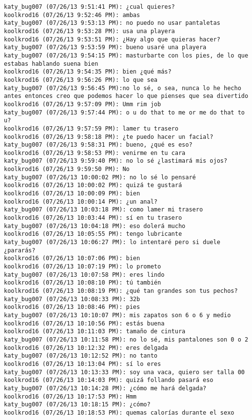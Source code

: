 \begin{verbatim}
katy_bug007 (07/26/13 9:51:41 PM): ¿cual quieres? 
koolkrod16 (07/26/13 9:52:46 PM): ambas
katy_bug007 (07/26/13 9:53:13 PM): no puedo no usar pantaletas 
koolkrod16 (07/26/13 9:53:28 PM): usa una playera
koolkrod16 (07/26/13 9:53:51 PM): ¿Hay algo que quieras hacer?
katy_bug007 (07/26/13 9:53:59 PM): bueno usaré una playera
katy_bug007 (07/26/13 9:54:15 PM): masturbarte con los pies, de lo que estabas hablando suena bien
koolkrod16 (07/26/13 9:54:35 PM): bien ¿qué más?
koolkrod16 (07/26/13 9:56:26 PM): lo que sea
katy_bug007 (07/26/13 9:56:45 PM):no lo sé, o sea, nunca lo he hecho antes entonces creo que podemos hacer lo que pienses que sea divertido
koolkrod16 (07/26/13 9:57:09 PM): Umm rim job
katy_bug007 (07/26/13 9:57:44 PM): o u do that to me or me do that to u? 
koolkrod16 (07/26/13 9:57:59 PM): lamer tu trasero
koolkrod16 (07/26/13 9:58:18 PM): ¿te puedo hacer un facial?
katy_bug007 (07/26/13 9:58:31 PM): bueno, ¿qué es eso?
koolkrod16 (07/26/13 9:58:53 PM): venirme en tu cara
katy_bug007 (07/26/13 9:59:40 PM): no lo sé ¿lastimará mis ojos?
koolkrod16 (07/26/13 9:59:50 PM): No
katy_bug007 (07/26/13 10:00:02 PM): no lo sé lo pensaré
koolkrod16 (07/26/13 10:00:02 PM): quizá te gustará
koolkrod16 (07/26/13 10:00:09 PM): bien
koolkrod16 (07/26/13 10:00:14 PM): ¿un anal?
katy_bug007 (07/26/13 10:03:18 PM): como lamer mi trasero
koolkrod16 (07/26/13 10:03:44 PM): sí en tu trasero
katy_bug007 (07/26/13 10:04:18 PM): eso dolerá mucho
koolkrod16 (07/26/13 10:05:55 PM): tengo lubricante
katy_bug007 (07/26/13 10:06:27 PM): lo intentaré pero si duele ¿pararás?
koolkrod16 (07/26/13 10:07:06 PM): bien
koolkrod16 (07/26/13 10:07:19 PM): lo prometo
katy_bug007 (07/26/13 10:07:58 PM): eres lindo
koolkrod16 (07/26/13 10:08:10 PM): tú también
koolkrod16 (07/26/13 10:08:19 PM): ¿qué tan grandes son tus pechos?
katy_bug007 (07/26/13 10:08:33 PM): 32b
koolkrod16 (07/26/13 10:08:46 PM): pies
katy_bug007 (07/26/13 10:10:07 PM): mis zapatos son 6 o 6 y medio
koolkrod16 (07/26/13 10:10:56 PM): estás buena
koolkrod16 (07/26/13 10:11:03 PM): tamaño de cintura
katy_bug007 (07/26/13 10:11:58 PM): no lo sé, mis pantalones son 0 o 2
koolkrod16 (07/26/13 10:12:32 PM): eres delgada
katy_bug007 (07/26/13 10:12:52 PM): no tanto
koolkrod16 (07/26/13 10:13:04 PM): sí lo eres
katy_bug007 (07/26/13 10:13:33 PM): soy una vaca, quiero ser talla 00
koolkrod16 (07/26/13 10:14:03 PM): quizá follando pasará eso
katy_bug007 (07/26/13 10:14:28 PM): ¿cómo me hará delgada?
koolkrod16 (07/26/13 10:17:53 PM): Hmm
katy_bug007 (07/26/13 10:18:15 PM): ¿cómo?
koolkrod16 (07/26/13 10:18:53 PM): quemas calorías durante el sexo

\end{verbatim}
